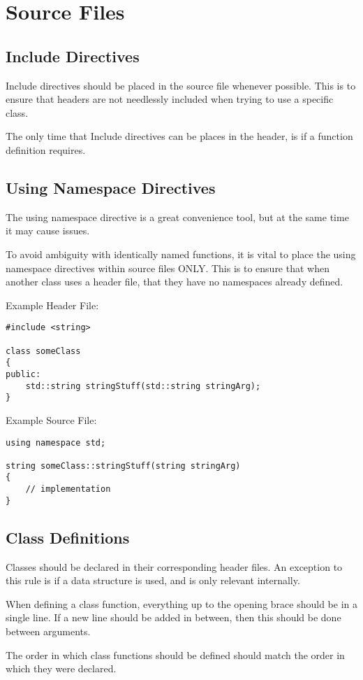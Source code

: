 \documentclass[12pt,article]{memoir}
\begin{document}
\newpage

\section{Source Files}
\subsection{Include Directives}
Include directives should be placed in the source file whenever possible. This is to ensure that headers are not needlessly included when trying to use a specific class.\par
The only time that Include directives can be places in the header, is if a function definition requires.\par

\subsection{Using Namespace Directives}
The using namespace directive is a great convenience tool, but at the same time it may cause issues.\par
To avoid ambiguity with identically named functions, it is vital to place the using namespace directives within source files ONLY. This is to ensure that when another class uses a header file, that they have no namespaces already defined.\par
Example Header File:
\begin{lstlisting}
#include <string>

class someClass
{
public:
	std::string stringStuff(std::string stringArg);
}
\end{lstlisting}

Example Source File:
\begin{lstlisting}
using namespace std;

string someClass::stringStuff(string stringArg)
{
	// implementation
}
\end{lstlisting}

\newpage

\subsection{Class Definitions}
Classes should be declared in their corresponding header files. An exception to this rule is if a data structure is used, and is only relevant internally.\par
When defining a class function, everything up to the opening brace should be in a single line. If a new line should be added in between, then this should be done between arguments.\par
The order in which class functions should be defined should match the order in which they were declared.

\end{document}
